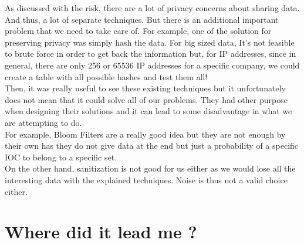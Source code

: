 \documentclass{eplmastersthesis}
\begin{document}
As discussed with the risk, there are a lot of privacy concerns about sharing data. And thus, a lot of separate techniques. But there is an additional important problem that we need to take care of. For example, one of the solution for preserving privacy was simply hash the data. For big sized data, It's not feasible to brute force in order to get back the information but, for IP addresses, since in general, there are only 256 or 65536 IP addresses for a specific company, we could create a table with all possible hashes and test them all!\\

Then, it was really useful to see these existing techniques but it unfortunately does not mean that it could solve all of our problems. They had other purpose when designing their solutions and it can lead to some disadvantage in what we are attempting to do.\\
For example, Bloom Filters are a really good idea but they are not enough by their own has they do not give data at the end but just a probability of a specific IOC to belong to a specific set.\\
On the other hand, sanitization is not good for us either as we would lose all the interesting data with the explained techniques. Noise is thus not a valid choice either.


\section{Where did it lead me ?}
\end{document}
